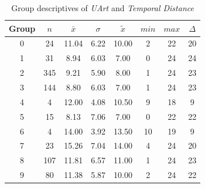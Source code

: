 \begin{table}[ht]
	\small
	\centering
    \begin{tabular}{c|c|c|c|c|c|c|c}
        \toprule
        Group & $n$ & $\bar{x}$ & $\sigma$ & $\tilde{x}$ & $min$ & $max$ & $\Delta$ \\
        \midrule
        0 & 24  & 11.04 & 6.22 & 10.00 & 2  & 22 & 20 \\ 
        1 & 31  & 8.94  & 6.03 & 7.00  & 0  & 24 & 24 \\ 
        2 & 345 & 9.21  & 5.90 & 8.00  & 1  & 24 & 23 \\ 
        3 & 144 & 8.80  & 6.03 & 7.00  & 1  & 24 & 23 \\ 
        4 & 4   & 12.00 & 4.08 & 10.50 & 9  & 18 & 9  \\ 
        5 & 15  & 8.13  & 7.06 & 7.00  & 0  & 22 & 22 \\ 
        6 & 4   & 14.00 & 3.92 & 13.50 & 10 & 19 & 9  \\ 
        7 & 23  & 15.26 & 7.04 & 14.00 & 4  & 24 & 20 \\ 
        8 & 107 & 11.81 & 6.57 & 11.00 & 1  & 24 & 23 \\ 
        9 & 80  & 11.38 & 5.87 & 10.00 & 2  & 24 & 22 \\ 
        \bottomrule
      \end{tabular}
    \caption{Group descriptives of \textit{UArt} and \textit{Temporal Distance}}
    \label{tbl:descriptives_baysis_initiator_UArt_TDist}
\end{table}

